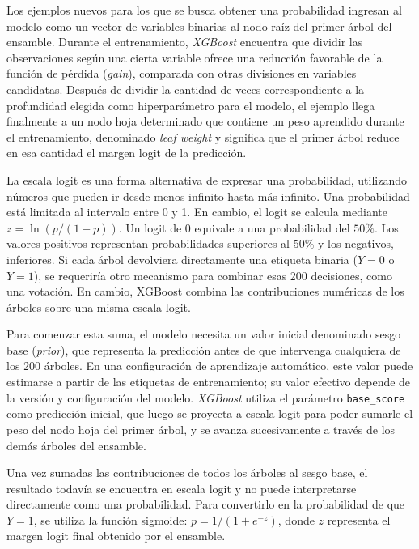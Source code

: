 \documentclass[journal]{IEEEtran}
\begin{document}
Los ejemplos nuevos para los que se busca obtener una probabilidad ingresan al modelo como un vector de variables binarias al nodo raíz del primer árbol del ensamble. Durante el entrenamiento, \textit{XGBoost} encuentra que dividir las observaciones según una cierta variable ofrece una reducción favorable de la función de pérdida (\textit{gain}), comparada con otras divisiones en variables candidatas. Después de dividir la cantidad de veces correspondiente a la profundidad elegida como hiperparámetro para el modelo, el ejemplo llega finalmente a un nodo hoja determinado que contiene un peso aprendido durante el entrenamiento, denominado \textit{leaf weight} y significa que el primer árbol reduce en esa cantidad el margen logit de la predicción. 

La escala logit \cite{bishop2006pattern} es una forma alternativa de expresar una probabilidad, utilizando números que pueden ir desde menos infinito hasta más infinito. Una probabilidad está limitada al intervalo entre 0 y 1. En cambio, el logit se calcula mediante $z = \ln(p / (1 - p))$. Un logit de 0 equivale a una probabilidad del $50\%$. Los valores positivos representan probabilidades superiores al $50\%$ y los negativos, inferiores. Si cada árbol devolviera directamente una etiqueta binaria ($Y=0$ o $Y=1$), se requeriría otro mecanismo para combinar esas 200 decisiones, como una votación. En cambio, XGBoost combina las contribuciones numéricas de los árboles sobre una misma escala logit.

Para comenzar esta suma, el modelo necesita un valor inicial denominado sesgo base (\textit{prior}), que representa la predicción antes de que intervenga cualquiera de los 200 árboles. En una configuración de aprendizaje automático, este valor puede estimarse a partir de las etiquetas de entrenamiento; su valor efectivo depende de la versión y configuración del modelo. \textit{XGBoost} utiliza el parámetro \texttt{base\_score} como predicción inicial, que luego se proyecta a escala logit para poder sumarle el peso del nodo hoja del primer árbol, y se avanza sucesivamente a través de los demás árboles del ensamble.

Una vez sumadas las contribuciones de todos los árboles al sesgo base, el resultado todavía se encuentra en escala logit y no puede interpretarse directamente como una probabilidad. Para convertirlo en la probabilidad de que $Y=1$, se utiliza \cite{bishop2006pattern} la función sigmoide: $p = 1 / (1 + e^{-z})$, donde $z$ representa el margen logit final obtenido por el ensamble.
\end{document}
